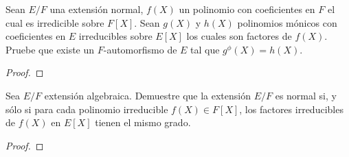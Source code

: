 \documentclass[12pt]{report}
\theoremstyle{largebreak}
\begin{document}
\begin{excer}
    Sean $E/F$ una extensión normal, $f(X)$ un polinomio con coeficientes en $F$ el cual es irredicible sobre $F[X]$. Sean $g(X)$ y $h(X)$ polinomios mónicos con coeficientes en $E$ irreducibles sobre $E[X]$ los cuales son factores de $f(X)$. Pruebe que existe un $F$-automorfismo de $E$ tal que $g^\phi(X)=h(X)$.
\end{excer}

\begin{proof}
    
\end{proof}

\begin{excer}
    Sea $E/F$ extensión algebraica. Demuestre que la extensión $E/F$ es normal si, y sólo si para cada polinomio irreducible $f(X)\in F[X]$, los factores irreducibles de $f(X)$ en $E[X]$ tienen el mismo grado.
\end{excer}

\begin{proof}
    
\end{proof}
\end{document}

